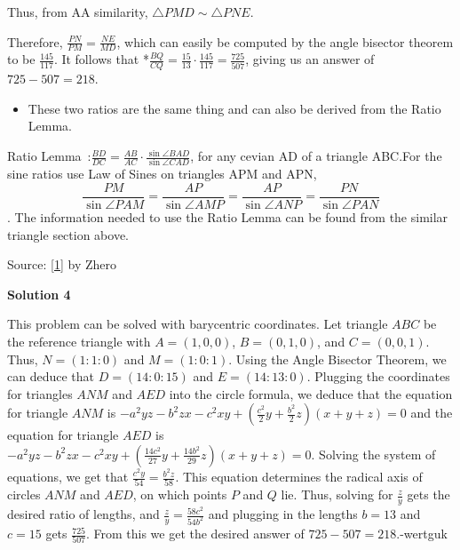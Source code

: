 \begin{enumerate}
 Thus, from AA similarity, $\triangle PMD \sim \triangle PNE$.

 Therefore, $\frac {PN}{PM} = \frac {NE}{MD}$, which can easily be computed by the angle bisector theorem to be $\frac {145}{117}$. It follows that *$\frac {BQ}{CQ} = \frac {15}{13} \cdot \frac {145}{117} = \frac {725}{507}$, giving us an answer of $725 - 507 = \boxed{218}$.

 
            \begin{itemize}
        \item These two ratios are the same thing and can also be derived from the Ratio Lemma.
            \end{itemize}
            Ratio Lemma :$\frac{BD}{DC} = \frac{AB}{AC} \cdot \frac{\sin \angle BAD}{\sin \angle CAD}$, for any cevian AD of a triangle ABC.For the sine ratios use Law of Sines on triangles APM and APN, 
 \[\frac{PM}{\sin \angle PAM}=\frac{AP}{\sin \angle AMP}=\frac{AP}{\sin \angle ANP}=\frac{PN}{\sin \angle PAN}\]. The information needed to use the Ratio Lemma can be found from the similar triangle section above.

 Source: \href{https://artofproblemsolving.comhttp://www.artofproblemsolving.com/Forum/viewtopic.php?p=1831745\#p1831745}{[1]} by Zhero

 



\textbf{Solution 4}

This problem can be solved with barycentric coordinates. Let triangle $ABC$ be the reference triangle with $A=(1,0,0)$, $B=(0,1,0)$, and $C=(0,0,1)$. Thus, $N=(1:1:0)$ and $M=(1:0:1)$. Using the Angle Bisector Theorem, we can deduce that $D=(14:0:15)$ and $E = (14:13:0)$. Plugging the coordinates for triangles $ANM$ and $AED$ into the circle formula, we deduce that the equation for triangle $ANM$ is $-a^2yz-b^2zx-c^2xy+(\frac{c^2}{2}y+\frac{b^2}{2}z)(x+y+z)=0$ and the equation for triangle $AED$ is $-a^2yz-b^2zx-c^2xy+(\frac{14c^2}{27}y+\frac{14b^2}{29}z)(x+y+z)=0$. Solving the system of equations, we get that $\frac{c^2y}{54}=\frac{b^2z}{58}$. This equation determines the radical axis of circles $ANM$ and $AED$, on which points $P$ and $Q$ lie. Thus, solving for $\frac{z}{y}$ gets the desired ratio of lengths, and $\frac{z}{y}=\frac{58c^2}{54b^2}$ and plugging in the lengths $b=13$ and $c=15$ gets $\frac{725}{507}$. From this we get the desired answer of $725-507=\boxed{218}$.-wertguk

 




\end{enumerate}

